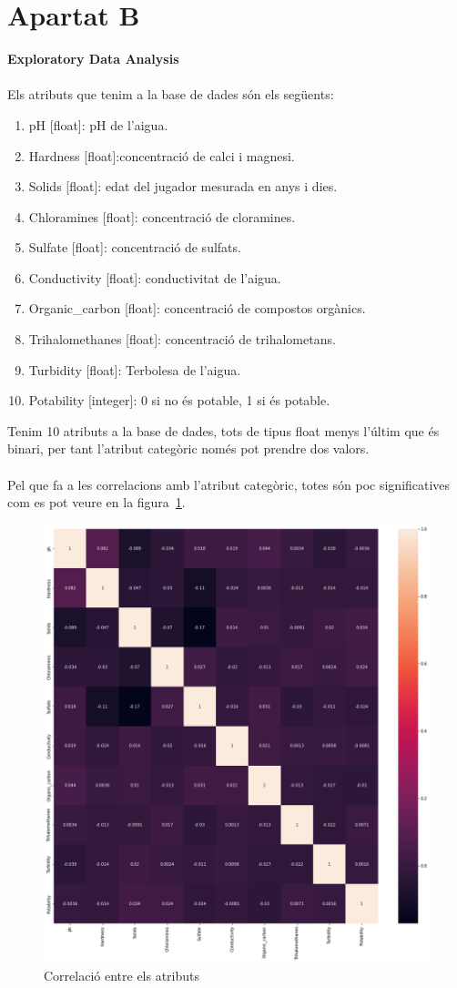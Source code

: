 \documentclass{article}
\begin{document}
	\section*{Apartat B}
	\textbf{Exploratory Data Analysis}\\
	\\
	Els atributs que tenim a la base de dades són els següents:
	\begin{enumerate}
		\addtocounter{enumi}{-1}
		\item pH [float]: pH de l'aigua.
		\item Hardness [float]:concentració de calci i magnesi.
		\item Solids [float]: edat del jugador mesurada en anys i dies.
		\item Chloramines [float]: concentració de cloramines. 
		\item Sulfate [float]: concentració de sulfats.
		\item Conductivity [float]: conductivitat de l'aigua.
		\item Organic\_carbon [float]: concentració de compostos orgànics.
		\item Trihalomethanes [float]: concentració de trihalometans.
		\item Turbidity [float]: Terbolesa de l'aigua.
		\item Potability [integer]: 0 si no és potable, 1 si és potable.
	\end{enumerate}
	Tenim 10 atributs a la base de dades, tots de tipus float menys l'últim que és binari, per tant l'atribut categòric només pot prendre dos valors.\\
	\\
	Pel que fa a les correlacions amb l'atribut categòric, totes són poc significatives com es pot veure en la figura~\ref{fig:correlacions}.\\
	\begin{figure}[!h]
		\centering
		\includegraphics[width=0.4\linewidth]{../images/correlacions}
		\caption{Correlació entre els atributs}
		\label{fig:correlacions}
	\end{figure}\\
\end{document}
